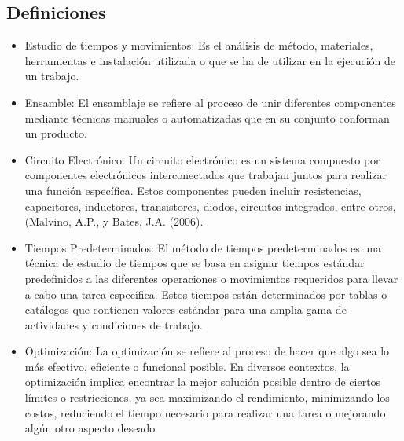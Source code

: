     \subsection{Definiciones}
    
    \begin{itemize}
        \item Estudio de tiempos y movimientos: Es el análisis de método, materiales, herramientas e instalación utilizada o que se ha de utilizar en la ejecución de un trabajo.
        \item Ensamble: El ensamblaje se refiere al proceso de unir diferentes componentes mediante técnicas manuales o automatizadas que en su conjunto conforman un producto.
         \item Circuito Electrónico: Un circuito electrónico es un sistema compuesto por componentes electrónicos interconectados que trabajan juntos para realizar una función específica. Estos componentes pueden incluir resistencias, capacitores, inductores, transistores, diodos, circuitos integrados, entre otros, (Malvino, A.P., y Bates, J.A. (2006).
         \item Tiempos Predeterminados: El método de tiempos predeterminados es una técnica de estudio de tiempos que se basa en asignar tiempos estándar predefinidos a las diferentes operaciones o movimientos requeridos para llevar a cabo una tarea específica. Estos tiempos están determinados por tablas o catálogos que contienen valores estándar para una amplia gama de actividades y condiciones de trabajo.
         \item Optimización: La optimización se refiere al proceso de hacer que algo sea lo más efectivo, eficiente o funcional posible. En diversos contextos, la optimización implica encontrar la mejor solución posible dentro de ciertos límites o restricciones, ya sea maximizando el rendimiento, minimizando los costos, reduciendo el tiempo necesario para realizar una tarea o mejorando algún otro aspecto deseado
    \end{itemize}
